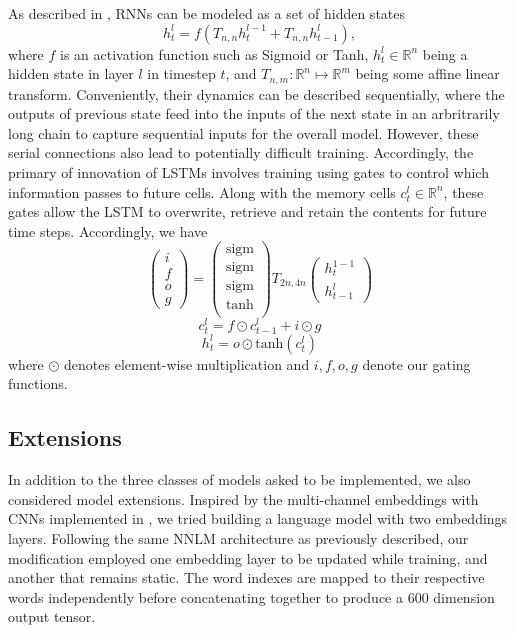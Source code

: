 \documentclass[11pt]{article}
\begin{document}
As described in \cite{DBLP:journals/corr/ZarembaSV14}, RNNs can be modeled as a set of hidden states 
\[
h_t^l = f(T_{n,n}h_t^{l-1} + T_{n,n}h_{t-1}^l), 
\]
where $f$ is an activation function such as Sigmoid or Tanh, $h_t^l \in \mathbb{R}^n$ being a hidden state in layer $l$ in timestep $t$, and $T_{n,m} : \mathbb{R}^n \mapsto \mathbb{R}^m$ being some affine linear transform. Conveniently, their dynamics can be described sequentially, where the outputs of previous state feed into the inputs of the next state in an arbritrarily long chain to capture sequential inputs for the overall model. However, these serial connections also lead to potentially difficult training. Accordingly, the primary of innovation of LSTMs involves training using gates to control which information passes to future cells. Along with the memory cells $c_t^l \in \mathbb{R}^n$, these gates allow the LSTM to overwrite, retrieve and retain the contents for future time steps. Accordingly, we have
\[
\begin{pmatrix}
i \\ f \\ o \\ g
\end{pmatrix}
= 
\begin{pmatrix}
\text{sigm} \\
\text{sigm} \\
\text{sigm} \\
\text{tanh} \\
\end{pmatrix} 
T_{2n, 4n}
\begin{pmatrix}
h_t^{1-1} \\
h_{t-1}^l
\end{pmatrix}
\]
\[
c_t^l = f \odot c_{t-1}^l + i \odot g
\]
\[
h_t^l = o \odot \text{tanh}(c_t^l)
\]
where $\odot$ denotes element-wise multiplication and $i, f, o, g$ denote our gating functions.

\subsection{Extensions}
In addition to the three classes of models asked to be implemented, we also considered model extensions. Inspired by the multi-channel embeddings with CNNs implemented in \cite{DBLP:journals/corr/Kim14f}, we tried building a language model with two embeddings layers. Following the same NNLM architecture as previously described, our modification employed one embedding layer to be updated while training, and another that remains static. The word indexes are mapped to their respective words independently before concatenating together to produce a 600 dimension output tensor.
\end{document}
